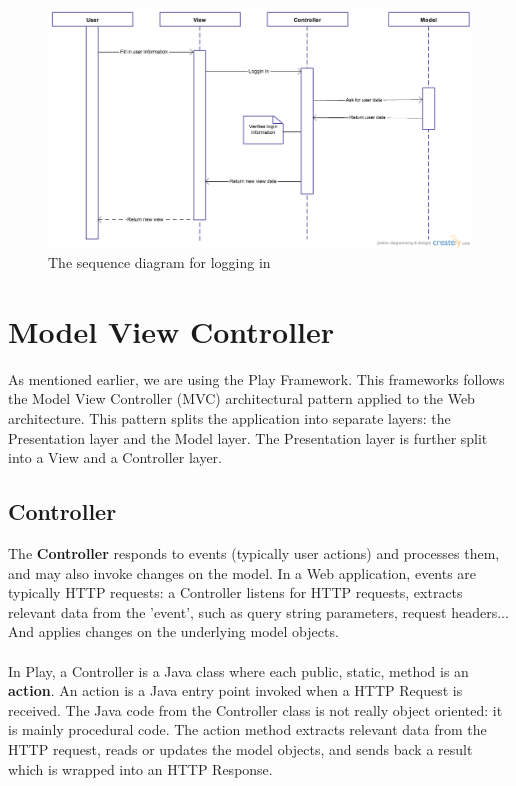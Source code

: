 \begin{figure}[h]
    \centering
    \captionsetup{justification=centering}
    \includegraphics[width=\textwidth, frame]{images/sequence_login}
    \caption{The sequence diagram for logging in}
    \label{sequence_login}
\end{figure}

\section{Model View Controller}
As mentioned earlier, we are using the Play Framework. 
This frameworks follows the Model View Controller (MVC) architectural pattern applied to the Web architecture\cite{playframework_mvc}.
This pattern splits the application into separate layers: the Presentation layer and the Model layer. 
The Presentation layer is further split into a View and a Controller layer.

\subsection{Controller}
The \textbf{Controller} responds to events (typically user actions) and processes them, and may also invoke changes on the model.
In a Web application, events are typically HTTP requests: a Controller listens for HTTP requests, extracts relevant data from the 'event', such as query string parameters, request headers... 
And applies changes on the underlying model objects.
\\\\
In Play, a Controller is a Java class where each public, static, method is an \textbf{action}.
An action is a Java entry point invoked when a HTTP Request is received.
The Java code from the Controller class is not really object oriented: it is mainly procedural code.
The action method extracts relevant data from the HTTP request, reads or updates the model objects, and sends back a result which is wrapped into an HTTP Response.

